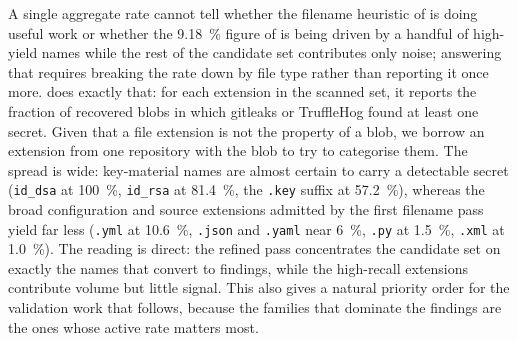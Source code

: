 A single aggregate rate cannot tell whether the filename heuristic of  is doing useful work or whether the \SI{9.18}{\percent} figure of  is being driven by a handful of high-yield names while the rest of the candidate set contributes only noise; answering that requires breaking the rate down by file type rather than reporting it once more.
 does exactly that: for each extension in the scanned set, it reports the fraction of recovered blobs in which gitleaks or TruffleHog found at least one secret.
Given that a file extension is not the property of a blob, we borrow an extension from one repository with the blob to try to categorise them.
The spread is wide: key-material names are almost certain to carry a detectable secret (\texttt{id\_dsa} at \SI{100}{\percent}, \texttt{id\_rsa} at \SI{81.4}{\percent}, the \texttt{.key} suffix at \SI{57.2}{\percent}), whereas the broad configuration and source extensions admitted by the first filename pass yield far less (\texttt{.yml} at \SI{10.6}{\percent}, \texttt{.json} and \texttt{.yaml} near \SI{6}{\percent}, \texttt{.py} at \SI{1.5}{\percent}, \texttt{.xml} at \SI{1.0}{\percent}).
The reading is direct: the refined pass concentrates the candidate set on exactly the names that convert to findings, while the high-recall extensions contribute volume but little signal.
This also gives a natural priority order for the validation work that follows, because the families that dominate the findings are the ones whose active rate matters most.

